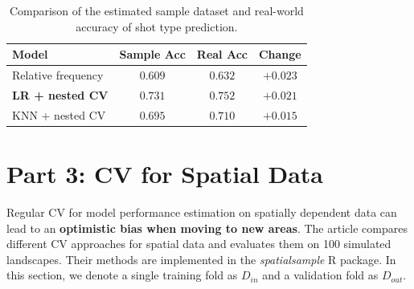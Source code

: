 \documentclass[fleqn,moreauthors,10pt]{ds_report}
\begin{document}
\begin{table}[h!]
    \centering
    \begin{tabular}{l c c c}
        \toprule
        \textbf{Model} & \textbf{Sample Acc} & \textbf{Real Acc} & \textbf{Change} \\
        \midrule
        Relative frequency      & $0.609$ & $0.632$ & $+0.023$ \\
        \textbf{LR + nested CV} & $\mathbf{0.731}$ & $\mathbf{0.752}$ & $\mathbf{+0.021}$ \\
        KNN + nested CV & $0.695$ & $0.710$ & $+0.015$ \\
        \bottomrule
    \end{tabular}
    \vspace{0.5em}
    \caption{Comparison of the estimated sample dataset and real-world accuracy of shot type prediction.}
    \label{tab3}
\end{table}

\section*{Part 3: CV for Spatial Data}

Regular CV for model performance estimation on spatially dependent data can lead to an \textbf{optimistic bias when moving to new areas}. The article \cite{mahoney2023assessingperformancespatialcrossvalidation} compares different CV approaches for spatial data and evaluates them on 100 simulated landscapes. Their methods are implemented in the \textit{spatialsample} R package. In this section, we denote a single training fold as $D_{in}$ and a validation fold as $D_{out}$.
\end{document}
